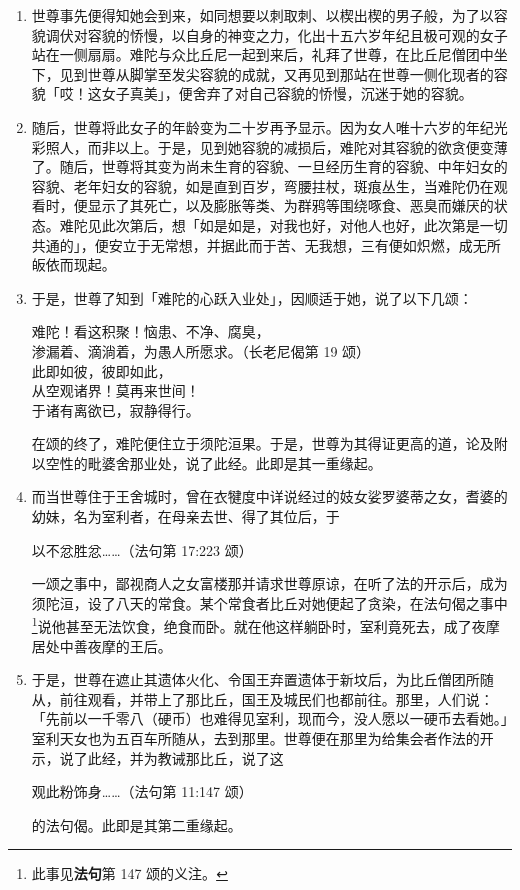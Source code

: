 \begin{enumerate}
\item 世尊事先便得知她会到来，如同想要以刺取刺、以楔出楔的男子般，为了以容貌调伏对容貌的㤭慢，以自身的神变之力，化出十五六岁年纪且极可观的女子站在一侧扇扇。难陀与众比丘尼一起到来后，礼拜了世尊，在比丘尼僧团中坐下，见到世尊从脚掌至发尖容貌的成就，又再见到那站在世尊一侧化现者的容貌「哎！这女子真美」，便舍弃了对自己容貌的㤭慢，沉迷于她的容貌。
\item 随后，世尊将此女子的年龄变为二十岁再予显示。因为女人唯十六岁的年纪光彩照人，而非以上。于是，见到她容貌的减损后，难陀对其容貌的欲贪便变薄了。随后，世尊将其变为尚未生育的容貌、一旦经历生育的容貌、中年妇女的容貌、老年妇女的容貌，如是直到百岁，弯腰拄杖，斑痕丛生，当难陀仍在观看时，便显示了其死亡，以及膨胀等类、为群鸦等围绕啄食、恶臭而嫌厌的状态。难陀见此次第后，想「如是如是，对我也好，对他人也好，此次第是一切共通的」，便安立于无常想，并据此而于苦、无我想，三有便如炽燃，成无所皈依而现起。
\item 于是，世尊了知到「难陀的心跃入业处」，因顺适于她，说了以下几颂：\begin{quoting}难陀！看这积聚！恼患、不净、腐臭，\\渗漏着、滴淌着，为愚人所愿求。（长老尼偈第 19 颂）\\此即如彼，彼即如此，\\从空观诸界！莫再来世间！\\于诸有离欲已，寂静得行。\end{quoting}在颂的终了，难陀便住立于须陀洹果。于是，世尊为其得证更高的道，论及附以空性的毗婆舍那业处，说了此经。此即是其一重缘起。
\item 而当世尊住于王舍城时，曾在衣犍度中详说经过的妓女娑罗婆蒂之女，耆婆的幼妹，名为室利者，在母亲去世、得了其位后，于\begin{quoting}以不忿胜忿……（法句第 17:223 颂）\end{quoting}一颂之事中，鄙视商人之女富楼那并请求世尊原谅，在听了法的开示后，成为须陀洹，设了八天的常食。某个常食者比丘对她便起了贪染，在法句偈之事中\footnote{此事见\textbf{法句}第 147 颂的义注。}说他甚至无法饮食，绝食而卧。就在他这样躺卧时，室利竟死去，成了夜摩居处中善夜摩的王后。
\item 于是，世尊在遮止其遗体火化、令国王弃置遗体于新坟后，为比丘僧团所随从，前往观看，并带上了那比丘，国王及城民们也都前往。那里，人们说：「先前以一千零八（硬币）也难得见室利，现而今，没人愿以一硬币去看她。」室利天女也为五百车所随从，去到那里。世尊便在那里为给集会者作法的开示，说了此经，并为教诫那比丘，说了这\begin{quoting}观此粉饰身……（法句第 11:147 颂）\end{quoting}的法句偈。此即是其第二重缘起。\end{enumerate}

